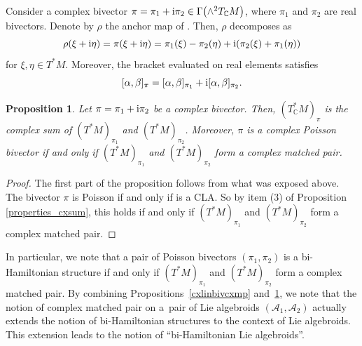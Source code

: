 \documentclass[pdftex]{sigma}
\numberwithin{equation}{section}
\newtheorem{Proposition}[Theorem]{Proposition}
 { \theoremstyle{definition}
\newtheorem{Definition}[Theorem]{Definition}
\newtheorem{Note}[Theorem]{Note}
\newtheorem{Example}[Theorem]{Example}
\newtheorem{Examples}[Theorem]{Examples}
\newtheorem{Remark}[Theorem]{Remark} }
\newcommand{\C}{{\mathbb{C}}}
\begin{document}
 Consider a complex bivector $\pi=\pi_1+{\rm i}\pi_2\in \Gamma\bigl(\wedge^2 T_{\C}M\bigr)$, where $\pi_1$ and $\pi_2$ are real bivectors. Denote by $\rho$ the anchor map of \smash{$\bigl(T_{\C}^*M\bigr)_{\pi}$}. Then, $\rho$ decomposes as
\[\rho(\xi+{\rm i}\eta)=\pi(\xi+{\rm i}\eta)=\pi_1(\xi)-\pi_2(\eta)+{\rm i}(\pi_2(\xi)+\pi_1(\eta))\]
for $\xi, \eta\in T^*M$.
Moreover, the bracket evaluated on real elements satisfies
\[[\alpha,\beta]_{\pi}=[\alpha,\beta]_{\pi_1}+{\rm i}[\alpha,\beta]_{\pi_2}.\]

\begin{Proposition}\label{cxbivcxmp}
 Let $\pi=\pi_1+{\rm i}\pi_2$ be a complex bivector. Then, $(T_{\C}^*M)_{\pi}$ is the complex sum of $(T^*M)_{\pi_1}$ and $(T^*M)_{\pi_2}$. Moreover, $\pi$ is a complex Poisson bivector if and only if $(T^*M)_{\pi_1}$ and $(T^*M)_{\pi_2}$ form a complex matched pair.
\end{Proposition}
\begin{proof}
   The first part of the proposition follows from what was exposed above. The bivector $\pi$ is Poisson if and only if \smash{$\bigl(T_{\C}^*M\bigr)_{\pi}$} is a CLA. So by item (3) of Proposition \ref{properties_cxsum}, this holds if and only if $(T^*M)_{\pi_1}$ and $(T^*M)_{\pi_2}$ form a complex matched pair.
\end{proof}

\begin{Remark}
In particular, we note that a pair of Poisson bivectors $(\pi_1,\pi_2)$ is a bi-Hamiltonian structure if and only if $(T^*M)_{\pi_1}$ and $(T^*M)_{\pi_2}$ form a complex matched pair. By combining Propositions~\ref{cxlinbivcxmp} and~\ref{cxbivcxmp}, we note that the notion of complex matched pair on a~pair of Lie algebroids $(\mathcal{A}_1,\mathcal{A}_2)$ actually extends the notion of bi-Hamiltonian structures to the context of Lie algebroids. This extension leads to the notion of ``bi-Hamiltonian Lie algebroids''.
\end{Remark}

\appendix
\end{document}
